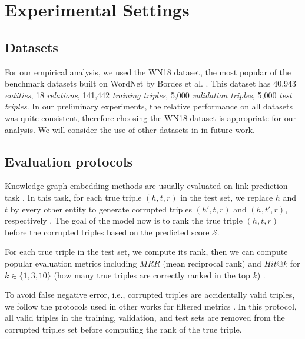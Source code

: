 \documentclass[sigconf,edbt]{acmart-edbt2019}
\def\gS{{\mathcal{S}}}
\begin{document}
\section{Experimental Settings}
\subsection{Datasets}
For our empirical analysis, we used the WN18 dataset, the most popular of the benchmark datasets built on WordNet \cite{millergeorgea._wordnetlexicaldatabase_1995} by Bordes et al. \cite{bordes_translatingembeddingsmodeling_2013}. This dataset has 40,943 \textit{entities}, 18 \textit{relations}, 141,442 \textit{training triples}, 5,000 \textit{validation triples}, 5,000 \textit{test triples}. In our preliminary experiments, the relative performance on all datasets was quite consistent, therefore choosing the WN18 dataset is appropriate for our analysis. We will consider the use of other datasets in in future work.

\subsection{Evaluation protocols}
Knowledge graph embedding methods are usually evaluated on link prediction task \cite{bordes_translatingembeddingsmodeling_2013}. In this task, for each true triple $ (h, t, r) $ in the test set, we replace $ h $ and $ t $ by every other entity to generate corrupted triples $ (h', t, r) $ and $ (h, t', r) $, respectively \cite{bordes_translatingembeddingsmodeling_2013}. The goal of the model now is to rank the true triple $ (h, t, r) $ before the corrupted triples based on the predicted score $ \gS $.

For each true triple in the test set, we compute its rank, then we can compute popular evaluation metrics including $ MRR $ (mean reciprocal rank) and $ Hit@k $ for $ k \in \{1, 3, 10\} $ (how many true triples are correctly ranked in the top $ k $) \cite{trouillon_complexembeddingssimple_2016}. 

To avoid false negative error, i.e., corrupted triples are accidentally valid triples, we follow the protocols used in other works for filtered metrics \cite{bordes_translatingembeddingsmodeling_2013}. In this protocol, all valid triples in the training, validation, and test sets are removed from the corrupted triples set before computing the rank of the true triple.
\end{document}
